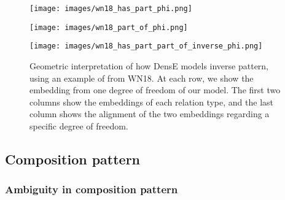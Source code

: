 \documentclass[11pt]{article}
\begin{document}
\begin{figure*}[htbp]
\begin{minipage}{4cm}
\centering
\texttt{[image: images/wn18\_has\_part\_phi.png]}
\subcaption{\tiny{}}
\end{minipage}\begin{minipage}{4cm}
\centering
\texttt{[image: images/wn18\_part\_of\_phi.png]}
\subcaption{\tiny{}}
\end{minipage}
\begin{minipage}{4cm}
\centering
\texttt{[image: images/wn18\_has\_part\_part\_of\_inverse\_phi.png]}
\subcaption{\tiny{}}
\end{minipage}


\caption{Geometric interpretation of how DensE models inverse pattern, using an example of  from WN18. At each row, we show the embedding from one degree of freedom of our model. The first two columns show the embeddings of each relation type, and the last column shows the alignment of the two embeddings regarding a specific degree of freedom. }
\label{inverse plots1}
\end{figure*}











\subsection{Composition pattern}

\subsubsection{Ambiguity in composition pattern}
\end{document}
